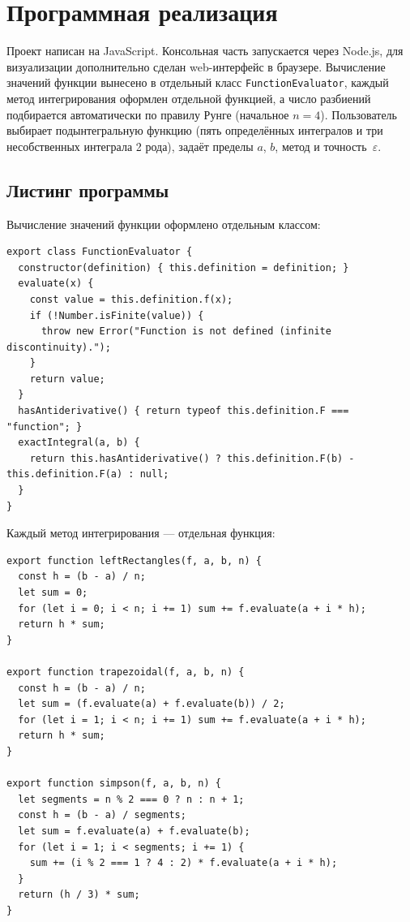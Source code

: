 \documentclass[12pt,a4paper]{article}
\begin{document}
\section{Программная реализация}

Проект написан на JavaScript. Консольная часть запускается через Node.js, для визуализации
дополнительно сделан web-интерфейс в браузере. Вычисление значений функции вынесено в
отдельный класс \texttt{FunctionEvaluator}, каждый метод интегрирования оформлен отдельной
функцией, а число разбиений подбирается автоматически по правилу Рунге (начальное $n=4$).
Пользователь выбирает подынтегральную функцию (пять определённых интегралов и три
несобственных интеграла 2 рода), задаёт пределы $a$, $b$, метод и точность~$\varepsilon$.

\subsection{Листинг программы}

Вычисление значений функции оформлено отдельным классом:

\begin{lstlisting}
export class FunctionEvaluator {
  constructor(definition) { this.definition = definition; }
  evaluate(x) {
    const value = this.definition.f(x);
    if (!Number.isFinite(value)) {
      throw new Error("Function is not defined (infinite discontinuity).");
    }
    return value;
  }
  hasAntiderivative() { return typeof this.definition.F === "function"; }
  exactIntegral(a, b) {
    return this.hasAntiderivative() ? this.definition.F(b) - this.definition.F(a) : null;
  }
}
\end{lstlisting}

Каждый метод интегрирования — отдельная функция:

\begin{lstlisting}
export function leftRectangles(f, a, b, n) {
  const h = (b - a) / n;
  let sum = 0;
  for (let i = 0; i < n; i += 1) sum += f.evaluate(a + i * h);
  return h * sum;
}

export function trapezoidal(f, a, b, n) {
  const h = (b - a) / n;
  let sum = (f.evaluate(a) + f.evaluate(b)) / 2;
  for (let i = 1; i < n; i += 1) sum += f.evaluate(a + i * h);
  return h * sum;
}

export function simpson(f, a, b, n) {
  let segments = n % 2 === 0 ? n : n + 1;
  const h = (b - a) / segments;
  let sum = f.evaluate(a) + f.evaluate(b);
  for (let i = 1; i < segments; i += 1) {
    sum += (i % 2 === 1 ? 4 : 2) * f.evaluate(a + i * h);
  }
  return (h / 3) * sum;
}
\end{lstlisting}
\end{document}
